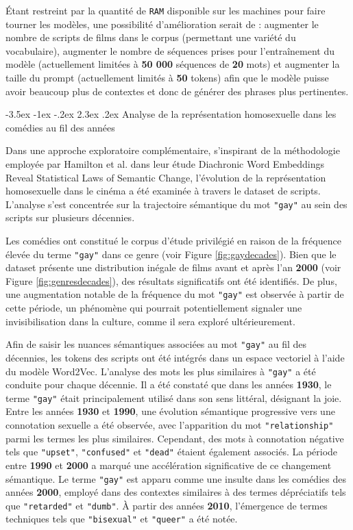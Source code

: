 \documentclass[12pt]{report}
\makeatletter
\renewcommand{\chapter}{\@startsection{chapter}{0}{\z@}
  {-3.5ex \@plus -1ex \@minus -.2ex}
  {2.3ex \@plus.2ex}
  {\normalfont\LARGE\bfseries}}
\makeatother
\begin{document}
Étant restreint par la quantité de \texttt{RAM} disponible sur les machines pour faire tourner les modèles, une possibilité d'amélioration serait de : augmenter le nombre de scripts de films dans le corpus (permettant une variété du vocabulaire), augmenter le nombre de séquences prises pour l'entraînement du modèle (actuellement limitées à \textbf{50 000} séquences de \textbf{20} mots) et augmenter la taille du prompt (actuellement limités à \textbf{50} tokens) afin que le modèle puisse avoir beaucoup plus de contextes et donc de générer des phrases plus pertinentes.

\chapter{Analyse de la représentation homosexuelle dans les comédies au fil des années}

Dans une approche exploratoire complémentaire, s'inspirant de la méthodologie employée par Hamilton et al. dans leur étude Diachronic Word Embeddings Reveal Statistical Laws of Semantic Change, l'évolution de la représentation homosexuelle dans le cinéma a été examinée à travers le dataset de scripts. L'analyse s'est concentrée sur la trajectoire sémantique du mot \texttt{"gay"} au sein des scripts sur plusieurs décennies. 

Les comédies ont constitué le corpus d'étude privilégié en raison de la fréquence élevée du terme \texttt{"gay"} dans ce genre (voir Figure \ref{fig:gaydecades}). Bien que le dataset présente une distribution inégale de films avant et après l'an \textbf{2000} (voir Figure \ref{fig:genresdecades}), des résultats significatifs ont été identifiés. De plus, une augmentation notable de la fréquence du mot \texttt{"gay"} est observée à partir de cette période, un phénomène qui pourrait potentiellement signaler une invisibilisation dans la culture, comme il sera exploré ultérieurement. 

Afin de saisir les nuances sémantiques associées au mot \texttt{"gay"} au fil des décennies, les tokens des scripts ont été intégrés dans un espace vectoriel à l'aide du modèle Word2Vec. L'analyse des mots les plus similaires à \texttt{"gay"} a été conduite pour chaque décennie. Il a été constaté que dans les années \textbf{1930}, le terme \texttt{"gay"} était principalement utilisé dans son sens littéral, désignant la joie. Entre les années \textbf{1930} et \textbf{1990}, une évolution sémantique progressive vers une connotation sexuelle a été observée, avec l'apparition du mot \texttt{"relationship"} parmi les termes les plus similaires. Cependant, des mots à connotation négative tels que \texttt{"upset"}, \texttt{"confused"} et \texttt{"dead"} étaient également associés. La période entre \textbf{1990} et \textbf{2000} a marqué une accélération significative de ce changement sémantique. Le terme \texttt{"gay"} est apparu comme une insulte dans les comédies des années \textbf{2000}, employé dans des contextes similaires à des termes dépréciatifs tels que \texttt{"retarded"} et \texttt{"dumb"}. À partir des années \textbf{2010}, l'émergence de termes techniques tels que \texttt{"bisexual"} et \texttt{"queer"} a été notée. 
\end{document}
